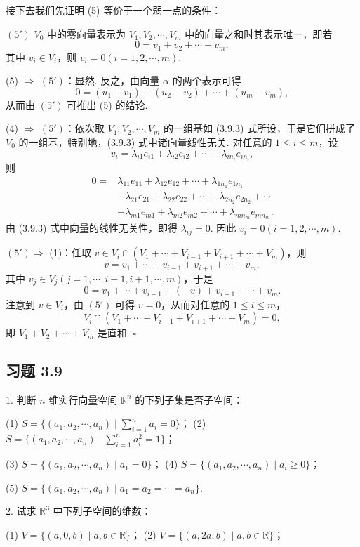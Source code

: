 \documentclass[UTF8, 12pt, fontset=fandol, oneside]{ctexart}
\begin{document}
接下去我们先证明 (5) 等价于一个弱一点的条件：

$(5')$ $V_0$ 中的零向量表示为 $V_1,V_2,\cdots,V_m$ 中的向量之和时其表示唯一，即若
\[
0=v_1+v_2+\cdots+v_m,
\]
其中 $v_i\in V_i$，则 $v_i=0(i=1,2,\cdots,m)$.

(5) $\Rightarrow$ $(5')$：显然. 反之，由向量 $\alpha$ 的两个表示可得
\[
0=(u_1-v_1)+(u_2-v_2)+\cdots+(u_m-v_m),
\]
从而由 $(5')$ 可推出 (5) 的结论.

(4) $\Rightarrow$ $(5')$：依次取 $V_1,V_2,\cdots,V_m$ 的一组基如 (3.9.3) 式所设，于是它们拼成了 $V_0$ 的一组基，特别地，(3.9.3) 式中诸向量线性无关. 对任意的 $1\leq i\leq m$，设
\[
v_i=\lambda_{i1}e_{i1}+\lambda_{i2}e_{i2}+\cdots+\lambda_{in_i}e_{in_i},
\]
则
\[
\begin{aligned}
0={}&\lambda_{11}e_{11}+\lambda_{12}e_{12}+\cdots+\lambda_{1n_1}e_{1n_1}\\
&+\lambda_{21}e_{21}+\lambda_{22}e_{22}+\cdots+\lambda_{2n_2}e_{2n_2}+\cdots\\
&+\lambda_{m1}e_{m1}+\lambda_{m2}e_{m2}+\cdots+\lambda_{mn_m}e_{mn_m}.
\end{aligned}
\]
由 (3.9.3) 式中向量的线性无关性，即得 $\lambda_{ij}=0$. 因此 $v_i=0(i=1,2,\cdots,m)$.

$(5')\Rightarrow$ (1)：任取 $v\in V_i\cap(V_1+\cdots+V_{i-1}+V_{i+1}+\cdots+V_m)$，则
\[
v=v_1+\cdots+v_{i-1}+v_{i+1}+\cdots+v_m,
\]
其中 $v_j\in V_j(j=1,\cdots,i-1,i+1,\cdots,m)$，于是
\[
0=v_1+\cdots+v_{i-1}+(-v)+v_{i+1}+\cdots+v_m.
\]
注意到 $v\in V_i$，由 $(5')$ 可得 $v=0$，从而对任意的 $1\leq i\leq m$，
\[
V_i\cap(V_1+\cdots+V_{i-1}+V_{i+1}+\cdots+V_m)=0,
\]
即 $V_1+V_2+\cdots+V_m$ 是直和. $\square$

\subsection*{习题 3.9}

1. 判断 $n$ 维实行向量空间 $\mathbb{R}^n$ 的下列子集是否子空间：

(1) $S=\{(a_1,a_2,\cdots,a_n)\mid \sum_{i=1}^n a_i=0\}$；\qquad
(2) $S=\{(a_1,a_2,\cdots,a_n)\mid \sum_{i=1}^n a_i^2=1\}$；

(3) $S=\{(a_1,a_2,\cdots,a_n)\mid a_1=0\}$；\qquad
(4) $S=\{(a_1,a_2,\cdots,a_n)\mid a_i\geq 0\}$；

(5) $S=\{(a_1,a_2,\cdots,a_n)\mid a_1=a_2=\cdots=a_n\}$.

2. 试求 $\mathbb{R}^3$ 中下列子空间的维数：

(1) $V=\{(a,0,b)\mid a,b\in\mathbb{R}\}$；\qquad
(2) $V=\{(a,2a,b)\mid a,b\in\mathbb{R}\}$；
\end{document}
